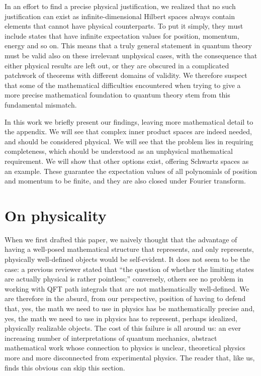 \documentclass[10pt,twocolumn, nofootinbib]{revtex4-2}
\begin{document}
In an effort to find a precise physical justification, we realized that no such justification can exist as infinite-dimensional Hilbert spaces always contain elements that cannot have physical counterparts. To put it simply, they must include states that have infinite expectation values for position, momentum, energy and so on. This means that a truly general statement in quantum theory must be valid also on these irrelevant unphysical cases, with the consequence that either physical results are left out, or they are obscured in a complicated patchwork of theorems with different domains of validity. We therefore suspect that some of the mathematical difficulties encountered when trying to give a more precise mathematical foundation to quantum theory stem from this fundamental mismatch.

In this work we briefly present our findings, leaving more mathematical detail to the appendix. We will see that complex inner product spaces are indeed needed, and should be considered physical. We will see that the problem lies in requiring completeness, which should be understood as an unphysical mathematical requirement. We will show that other options exist, offering Schwartz spaces as an example. These guarantee the expectation values of all polynomials of position and momentum to be finite, and they are also closed under Fourier transform.

\section{On physicality}

When we first drafted this paper, we naively thought that the advantage of having a well-posed mathematical structure that represents, and only represents, physically well-defined objects would be self-evident. It does not seem to be the case: a previous reviewer stated that ``the question of whether the limiting states are actually physical is rather pointless;'' conversely, others see no problem in working with QFT path integrals that are not mathematically well-defined. We are therefore in the absurd, from our perspective, position of having to defend that, yes, the math we need to use in physics has be mathematically precise and, yes, the math we need to use in physics has to represent, perhaps idealized, physically realizable objects. The cost of this failure is all around us: an ever increasing number of interpretations of quantum mechanics, abstract mathematical work whose connection to physics is unclear, theoretical physics more and more disconnected from experimental physics. The reader that, like us, finds this obvious can skip this section.
\end{document}

